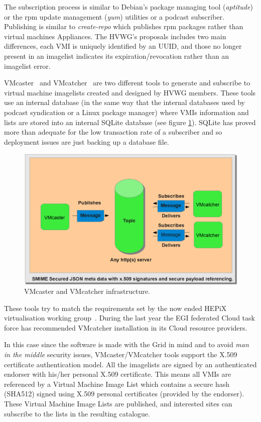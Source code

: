 \documentclass{cai}
\begin{document}
The subscription process is similar to Debian's package managing tool (\textit{aptitude}) or the rpm update management (\textit{yum}) utilities or a podcast subscriber. 
Publishing is similar to \textit{create-repo} which publishes rpm packages rather than virtual machines Appliances. 
The HVWG's proposals includes two main differences, each VMI is uniquely identified by an UUID, and those no longer present in an imagelist indicates its expiration/revocation rather than an imagelist error.


VMcaster~\cite{vmcaster} and VMcatcher~\cite{vmcatcher} are two different tools to generate and subscribe to virtual machine imagelists created and designed by HVWG members.
These tools use an internal database (in the same way that the internal databases used by podcast syndication or a Linux package manager) where VMIs information and lists are stored into an internal SQLite database (see figure \ref{fig:infrastructure}).
SQLite has proved more than adequate for the low transaction rate of a subscriber and so deployment issues are just backing up a database file.

\begin{figure}
\centering
\includegraphics[width=1\textwidth]{vmcaster_vmcatcher.png}
\caption{VMcaster and VMcatcher infrastructure.}
\label{fig:infrastructure}
\end{figure}

These tools try to match the requirements set by the now ended HEPiX virtualisation working group~\cite{hepix}.
During the last year the EGI federated Cloud task force has recommended VMcatcher installation in its Cloud resource providers.

In this case since the software is made with the Grid in mind and to avoid {\it man in the middle} security issues, VMcaster/VMcatcher tools support the X.509 certificate authentication model.
All the imagelists are signed by an authenticated endorser with his/her personal X.509 certificate. 
This means all VMIs are referenced by a Virtual Machine Image List which contains a secure hash (SHA512) signed using X.509 personal certificates (provided by the endorser). 
These Virtual Machine Image Lists are published, and interested sites can subscribe to the lists in the resulting catalogue. 
\end{document}
